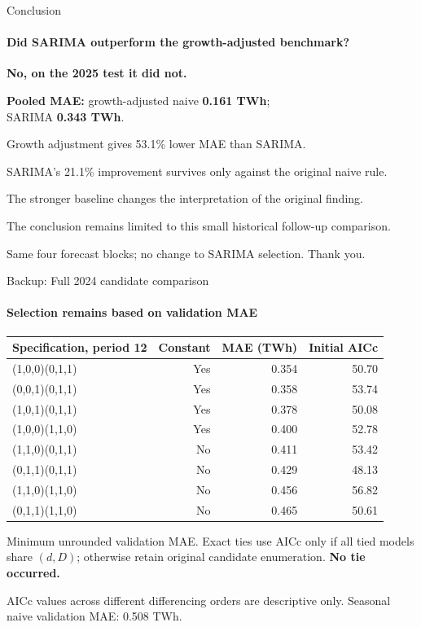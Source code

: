\documentclass[aspectratio=169,10pt]{beamer}
\newcommand{\Source}[1]{\par\vfill{\fontsize{6.5}{7.5}\selectfont\color{black!65}#1\par}}
\newcommand{\SmallTable}{\fontsize{9}{10.5}\selectfont}
\begin{document}
\begin{frame}[t]{Conclusion}
\framesubtitle{Did SARIMA outperform the growth-adjusted benchmark?}
\par\bigskip
{\Large\bfseries No, on the 2025 test it did not.\par}
\par\bigskip
\textbf{Pooled MAE:} growth-adjusted naive \textbf{0.161 TWh};\\SARIMA \textbf{0.343 TWh}.
\par\medskip\par
Growth adjustment gives 53.1\% lower MAE than SARIMA.\par
SARIMA's 21.1\% improvement survives only against the original naive rule.
\par\bigskip
The stronger baseline changes the interpretation of the original finding.\par
The conclusion remains limited to this small historical follow-up comparison.
\Source{Same four forecast blocks; no change to SARIMA selection. Thank you.}
\end{frame}

\appendix
\begin{frame}[t]{Backup: Full 2024 candidate comparison}
\framesubtitle{Selection remains based on validation MAE}
\begin{center}
\SmallTable
\begin{tabularx}{\linewidth}{@{}Xrrr@{}}\toprule
Specification, period 12 & Constant & MAE (TWh) & Initial AICc\\
\midrule
(1,0,0)(0,1,1) & Yes & 0.354 & 50.70\\
(0,0,1)(0,1,1) & Yes & 0.358 & 53.74\\
(1,0,1)(0,1,1) & Yes & 0.378 & 50.08\\
(1,0,0)(1,1,0) & Yes & 0.400 & 52.78\\
(1,1,0)(0,1,1) & No & 0.411 & 53.42\\
(0,1,1)(0,1,1) & No & 0.429 & 48.13\\
(1,1,0)(1,1,0) & No & 0.456 & 56.82\\
(0,1,1)(1,1,0) & No & 0.465 & 50.61\\
\bottomrule\end{tabularx}

\end{center}
\small Minimum unrounded validation MAE. Exact ties use AICc only if all tied models share $(d,D)$; otherwise retain original candidate enumeration. \textbf{No tie occurred.}
\Source{AICc values across different differencing orders are descriptive only. Seasonal naive validation MAE: 0.508 TWh.}
\end{frame}
\end{document}
